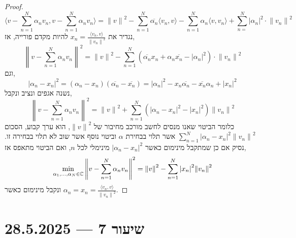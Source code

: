 \begin{proof}
	\[
		\langle v - \sum_{n = 1}^N \alpha_n v_n, v - \sum_{n = 1}^N \alpha_n v_n \rangle
		= {\lVert v \rVert}^2 - \sum_{n = 1}^N \overline{\alpha_n} \langle v_n, v \rangle - \sum_{n = 1}^N \alpha_n \langle v, v_n \rangle + \sum_{n = }^N {| \alpha_n |}^2 \cdot {\lVert v_n \rVert}^2
	\]
	נגדיר את $x_n = \frac{\langle v_n, v \rangle}{{\lVert v_n \rVert}^2}$ להיות מקדם פורייה, אז,
	\[
		{\left\lVert v - \sum_{n = 1}^N \alpha_n v_n \right\rVert}^2
		= {\lVert v \rVert}^2 - \sum_{n = 1}^N (\overline{\alpha_n} x_n + \alpha_n \overline{x_n} - {| \alpha_n |}^2) \cdot {\lVert v_n \rVert}^2
	\]
	וגם,
	\[
		{|\alpha_n - x_n|}^2
		= (\alpha_n - x_n)(\overline{\alpha_n} - \overline{x_n})
		= {|\alpha_n|}^2 - x_n \overline{\alpha_n} - \overline{x_n} \alpha_n  + {|x_n|}^2
	\]
	נשנה אגפים ונציב ונקבל,
	\[
		{\left\lVert v - \sum_{n = 1}^N \alpha_n v_n \right\rVert}^2
		= {\lVert v \rVert}^2 + \sum_{n = 1}^N \left( {|\alpha_n - x_n|}^2 - {|x_n|}^2 \right) {\lVert v_n \rVert}^2
	\]
	כלומר הביטוי שאנו מנסים לחשב מורכב מחיבור של ${\lVert v \rVert}^2$, הוא ערך קבוע, הסכום $\sum_{n = 1}^N {|\alpha_n - x_n|}^2 {\lVert v_n \rVert}^2$ אשר תלוי בבחירת $\alpha$ וביטוי נוסף אשר שוב לא תלוי בבחירה זו.
	נסיק אם כן שמתקבל מינימום כאשר ${| \alpha_n - x_n |}^2$ מינימלי לכל $n$, ואם הביטוי מתאפס אז,
	\[
		\min_{\alpha_1, \ldots, \alpha_N \in \mathbb{C}} {\left\lVert v - \sum_{n = 1}^N \alpha_n v_n \right\rVert}^2
		= {\lVert v \rVert}^2 - \sum_{n = 1}^N {|x_n|}^2 {\lVert v_n \rVert}^2
	\]
	ונקבל מינימום כאשר $\alpha_n = x_n = \frac{\langle v_n, v \rangle}{{\lVert v_n \rVert}^2}$.
\end{proof}

\section{שיעור 7 --- 28.5.2025}

